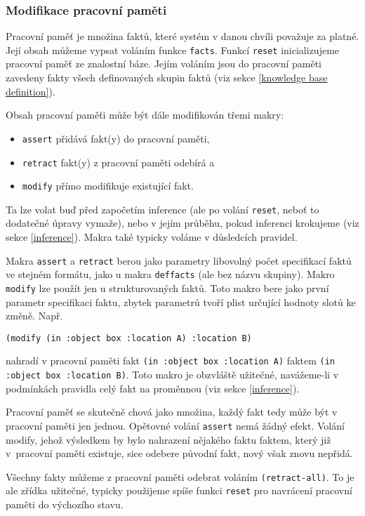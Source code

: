 \subsubsection{Modifikace pracovní paměti}
\label{modifikace}

Pracovní paměť je množina faktů, které systém v danou chvíli považuje za platné.
Její obsah můžeme vypsat voláním funkce \verb|facts|. Funkcí \verb|reset|
inicializujeme pracovní paměť ze znalostní báze. Jejím voláním jsou do pracovní
paměti zavedeny fakty všech definovaných skupin faktů (viz sekce
\ref{knowledge base definition}).

Obsah pracovní paměťi může být dále modifikován třemi makry:
\begin{itemize}
  \item \verb|assert| přidává fakt(y) do pracovní paměti,
  \item \verb|retract| fakt(y) z pracovní paměti odebírá a
  \item \verb|modify| přímo modifikuje existující fakt.
\end{itemize}
Ta lze volat buď před započetím inference (ale po volání \verb|reset|, neboť to
dodatečné úpravy vymaže), nebo v jejím průběhu, pokud inferenci krokujeme (viz
sekce \ref{inference}). Makra také typicky voláme v důsledcích pravidel.

Makra \verb|assert| a \verb|retract| berou jako parametry libovolný počet
specifikací faktů ve stejném formátu, jako u makra \verb|deffacts| (ale bez
názvu skupiny). Makro \verb|modify| lze použít jen u strukturovaných faktů. Toto
makro bere jako první parametr specifikaci faktu, zbytek parametrů tvoří plist
určující hodnoty slotů ke změně. Např.
\begin{verbatim}
(modify (in :object box :location A) :location B)
\end{verbatim}
nahradí v pracovní paměti fakt \verb|(in :object box :location A)| faktem
\verb|(in :object box :location B)|.
Toto makro je obzvláště užitečné, navážeme-li v podmínkách pravidla celý fakt na
proměnnou (viz sekce \ref{inference}).

Pracovní paměť se skutečně chová jako množina, každý fakt tedy může být v
pracovní paměti jen jednou. Opětovné volání \verb|assert| nemá žádný efekt.
Volání modify, jehož výsledkem by bylo nahrazení nějakého faktu faktem, který
již v~pracovní paměti existuje, sice odebere původní fakt, nový však znovu
nepřidá.

Všechny fakty můžeme z pracovní paměti odebrat voláním \verb|(retract-all)|. To
je ale zřídka užitečné, typicky použijeme spíše funkci \verb|reset| pro
navrácení pracovní paměti do výchozího stavu.
